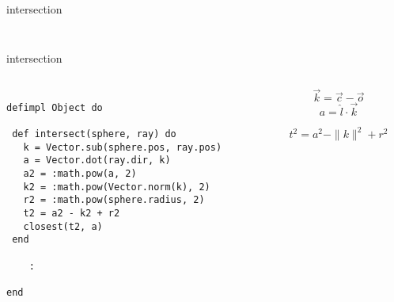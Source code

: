 \begin{frame}{intersection}
\begin{columns}
\begin{column}{0.4\linewidth}
\begin{figure}
\end{figure}
 \end{column}
\pause 
\begin{column}{0.6\linewidth}
  \pause
  \begin{itemize}
  \end{itemize}
 \end{column}
\end{columns} 
\end{frame}


\begin{frame}[fragile]{intersection}

\begin{columns}
 \begin{column}{0.6\linewidth}
\begin{verbatim}

defimpl Object do

 def intersect(sphere, ray) do
   k = Vector.sub(sphere.pos, ray.pos)
   a = Vector.dot(ray.dir, k)
   a2 = :math.pow(a, 2)
   k2 = :math.pow(Vector.norm(k), 2)
   r2 = :math.pow(sphere.radius, 2)
   t2 = a2 - k2 + r2
   closest(t2, a)
 end

    :

end

\end{verbatim}
 \end{column}
\pause
 \begin{column}{0.4\linewidth}
$$\vec{k} =  \vec{c} - \vec{o}$$
$$a = \hat{l}\cdot\vec{k}$$

$${t}^2 = {a}^2 - \|k\|^2 + {r}^2 $$
 \end{column}
\end{columns}
\end{frame}


